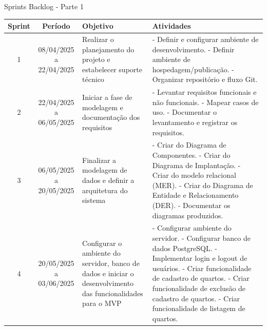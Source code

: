 \documentclass[
	12pt,				%
	openany,			%
	twoside,			%
	a4paper,			%
	english,			%
	french,				%
	spanish,			%
	brazil				%
	]{abntex2}
\begin{document}
\begin{quadro}[H]
	\caption{Sprints Backlog - Parte 1} 
	\label{sprints_backlog_1} 
	\begin{tabular}{|c|c|p{4cm}|p{6cm}|}
	\hline
	\textbf{Sprint} & \textbf{Período} & \textbf{Objetivo} & \textbf{Atividades} \\
		\hline
		1 & 08/04/2025 a 22/04/2025 & Realizar o planejamento do projeto e estabelecer suporte técnico &
		- Definir e configurar ambiente de desenvolvimento. \newline
		- Definir ambiente de hospedagem/publicação. \newline
		- Organizar repositório e fluxo Git. \\
		\hline
		2 & 22/04/2025 a 06/05/2025 & Iniciar a fase de modelagem e documentação dos requisitos &
		- Levantar requisitos funcionais e não funcionais. \newline
		- Mapear casos de uso. \newline
		- Documentar o levantamento e registrar os requisitos. \\
		\hline
		3 & 06/05/2025 a 20/05/2025 & Finalizar a modelagem de dados e definir a arquitetura do sistema &
		- Criar do Diagrama de Componentes. \newline
		- Criar do Diagrama de Implantação. \newline
		- Criar do modelo relacional (MER). \newline
		- Criar do Diagrama de Entidade e Relacionamento (DER). \newline
		- Documentar os diagramas produzidos. \\
		\hline	
		4 & 20/05/2025 a 03/06/2025 & Configurar o ambiente do servidor, banco de dados e iniciar o desenvolvimento das funcionalidades para o MVP &
		- Configurar ambiente do servidor. \newline
		- Configurar banco de dados PostgreSQL. \newline
		- Implementar login e logout de usuários. \newline
		- Criar funcionalidade de cadastro de quartos. \newline
		- Criar funcionalidade de exclusão de cadastro de quartos. \newline
		- Criar funcionalidade de listagem de quartos. \\
		\hline
		\end{tabular}
			\end{quadro}
			
\end{document}
